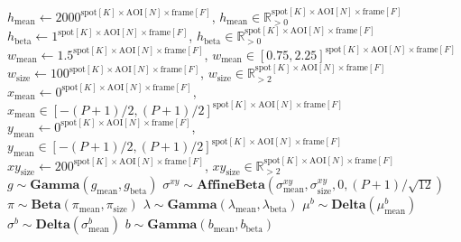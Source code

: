 \begin{algorithmic}[1]
{    $h_\mathrm{mean} \gets 2000^{\mathrm{spot}[K] \times \mathrm{AOI}[N] \times \mathrm{frame}[F]} $, \quad $h_\mathrm{mean} \in \mathbb{R}_{>0}^{\mathrm{spot}[K] \times \mathrm{AOI}[N] \times \mathrm{frame}[F]} $ \\
    $h_\mathrm{beta} \gets 1^{\mathrm{spot}[K] \times \mathrm{AOI}[N] \times \mathrm{frame}[F]}$, \quad $h_\mathrm{beta} \in \mathbb{R}_{>0}^{\mathrm{spot}[K] \times \mathrm{AOI}[N] \times \mathrm{frame}[F]}$ \\
    $w_\mathrm{mean} \gets 1.5^{\mathrm{spot}[K] \times \mathrm{AOI}[N] \times \mathrm{frame}[F]}$, \quad $w_\mathrm{mean} \in [0.75, 2.25]^{\mathrm{spot}[K] \times \mathrm{AOI}[N] \times \mathrm{frame}[F]}$ \\
    $w_\mathrm{size} \gets 100^{\mathrm{spot}[K] \times \mathrm{AOI}[N] \times \mathrm{frame}[F]}$, \quad $w_\mathrm{size} \in \mathbb{R}_{>2}^{\mathrm{spot}[K] \times \mathrm{AOI}[N] \times \mathrm{frame}[F]}$ \\
    $x_\mathrm{mean} \gets 0^{\mathrm{spot}[K] \times \mathrm{AOI}[N] \times \mathrm{frame}[F]}$, \quad $x_\mathrm{mean} \in [-(P+1)/2, (P+1)/2]^{\mathrm{spot}[K] \times \mathrm{AOI}[N] \times \mathrm{frame}[F]}$ \\
    $y_\mathrm{mean} \gets 0^{\mathrm{spot}[K] \times \mathrm{AOI}[N] \times \mathrm{frame}[F]}$, \quad $y_\mathrm{mean} \in [-(P+1)/2, (P+1)/2]^{\mathrm{spot}[K] \times \mathrm{AOI}[N] \times \mathrm{frame}[F]}$ \\
    $xy_\mathrm{size} \gets 200^{\mathrm{spot}[K] \times \mathrm{AOI}[N] \times \mathrm{frame}[F]}$, \quad $xy_\mathrm{size} \in \mathbb{R}_{>2}^{\mathrm{spot}[K] \times \mathrm{AOI}[N] \times \mathrm{frame}[F]}$
    }
\State $g \sim \mathbf{Gamma}(g_\mathrm{mean}, g_\mathrm{beta})$
\State $\sigma^{xy} \sim \mathbf{AffineBeta}(\sigma^{xy}_\mathrm{mean}, \sigma^{xy}_\mathrm{size}, 0, (P+1) / \sqrt{12})$
\State $\pi \sim \mathbf{Beta}(\pi_\mathrm{mean}, \pi_\mathrm{size})$
\State $\lambda \sim \mathbf{Gamma}(\lambda_\mathrm{mean}, \lambda_\mathrm{beta})$
    \State $\mu^b \sim \mathbf{Delta}(\mu^b_\mathrm{mean})$
    \State $\sigma^b \sim \mathbf{Delta}(\sigma^b_\mathrm{mean})$
        \State $b \sim \mathbf{Gamma}(b_\mathrm{mean}, b_\mathrm{beta})$

\end{algorithmic}
